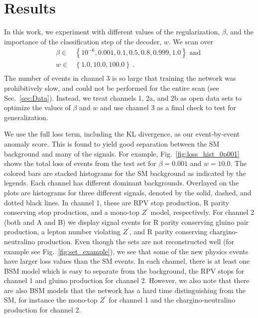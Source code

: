 \documentclass[submission, Phys]{SciPost}
\begin{document}
\section{Results}
\label{sec:Results}

In this work, we experiment with different values of the regularization, $\beta$, and the importance of the classification step of the decoder, $w$.
We scan over
\begin{equation}
\begin{aligned}
\beta \in& \left\{10^{-6}, 0.001, 0.1, 0.5, 0.8, 0.999, 1.0 \right\} \text{ and }\\
w \in& \left\{1.0, 10.0, 100.0 \right\}~. \\
\end{aligned}
\end{equation}
The number of events in channel 3 is so large that training the network was prohibitively slow, and could not be performed for the entire scan (see Sec.~\ref{sec:Data}).
Instead, we treat channels 1, 2a, and 2b as open data sets to optimize the values of $\beta$ and $w$ and use channel 3 as a final check to test for generalization.

We use the full loss term, including the KL divergence, as our event-by-event anomaly score.
This is found to yield good separation between the SM background and many of the signals.
For example, Fig.~\ref{fig:loss_hist_0p001} shows the total loss of events from the test set for $\beta=0.001$ and $w=10.0$.
The colored bars are stacked histograms for the SM background as indicated by the legends.
Each channel has different dominant backgrounds.
Overlayed on the plots are histograms for three different signals, denoted by the solid, dashed, and dotted black lines.
In channel 1, these are RPV stop production, R parity conserving stop production, and a mono-top $Z^{\prime}$ model, respectively.
For channel 2 (both and A and B) we display signal events for R parity conserving gluino pair production, a lepton number violating $Z^{\prime}$, and R parity conserving chargino-neutralino production.
Even though the sets are not reconstructed well (for example see Fig.~\ref{fig:set_example}), we see that some of the new physics events have larger loss values than the SM events.
In each channel, there is at least one BSM model which is easy to separate from the background, the RPV stops for channel 1 and gluino production for channel 2.
However, we also note that there are also BSM models that the network has a hard time distinguishing from the SM, for instance the mono-top $Z^{\prime}$ for channel 1 and the chargino-neutralino production for channel 2.
\end{document}
